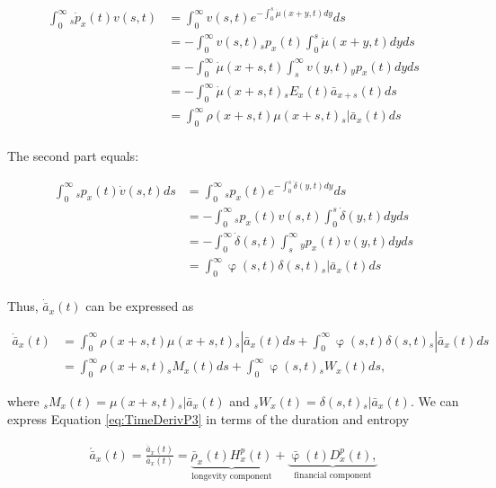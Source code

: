 \documentclass[12pt]{article}
\begin{document}
\begin{equation}\label{eq:TimeDerivP1}
\begin{split}
\int_0^\infty {}_s\dot{p}_x(t) v(s,t) &= \int_0^\infty   v(s,t) e^{-\int_0^{s}\dot{\mu}(x+y,t)dy}ds\\
&= -\int_0^\infty   v(s,t) {}_sp_x(t)\int_0^{s}\dot{\mu}(x+y,t)dyds\\
&= -\int_0^\infty  \dot{\mu}(x+s,t) \int_s^{\infty} v(y,t) {}_yp_x(t) dyds\\
&= - \int_0^\infty \dot{\mu}(x+s,t)   {}_sE_x(t) \bar{a} _{x+s}(t) ds\\
&= \int_0^\infty \rho(x+s,t) \mu(x+s,t)   {}_s|\bar{a}_x(t) ds\\
\end{split}
\end{equation}


The second part equals:

\begin{equation}\label{eq:TimeDerivP2}
\begin{split}
\int_0^\infty {}_sp_x(t) \dot{v}(s,t)ds &= \int_0^\infty {}_sp_x(t)  e^{-\int_0^{s}\dot{\delta}(y,t)dy}ds\\
&= -\int_0^\infty {}_sp_x(t) v(s,t) \int_0^{s}\dot{\delta}(y,t)dy ds\\
&= -\int_0^\infty  \dot{\delta}(s,t)\int_s^{\infty} {}_yp_x(t) v(y,t) dy ds\\
&= \int_0^\infty  \upvarphi(s,t) \delta(s,t)  {}_s|\bar{a}_x(t) ds\\
\end{split}
\end{equation}


Thus, $\dot{\bar{a}} _x(t)$ can be expressed as


\begin{equation}\label{eq:TimeDerivP3}
\begin{split}
\dot{\bar{a}}_{x}(t) &=  \int_0^\infty \rho(x+s,t) \mu(x+s,t){}_s|\bar{a}_x(t) ds +\int_0^\infty  \upvarphi(s,t) \delta(s,t)  {}_s|\bar{a}_x(t) ds\\
&= \int_0^\infty \rho(x+s,t) {}_sM_x(t)  ds +\int_0^\infty  \upvarphi(s,t) {}_sW_x(t)  ds,
\end{split}
\end{equation}


where ${}_sM_x(t)= \mu(x+s,t){}_s|\bar{a}_x(t)$ and ${}_sW_x(t)=\delta(s,t)  {}_s|\bar{a}_x(t)$. We can express Equation \ref{eq:TimeDerivP3} in terms of the duration and entropy


\begin{equation}\label{eq:TimeDerivP}
\begin{split}
 \acute{\bar{a}}_x(t) = \frac{\dot{\bar{a}}_x(t)}{\bar{a}_x(t)}  = 
 \underbrace{\bar{\rho}_x(t){H}^{p}_x(t)}_\text{longevity component}
 +\underbrace{\bar{\upvarphi}(t){D}^{p}_x(t),}_\text{financial component}
\end{split}
\end{equation}
\end{document}
